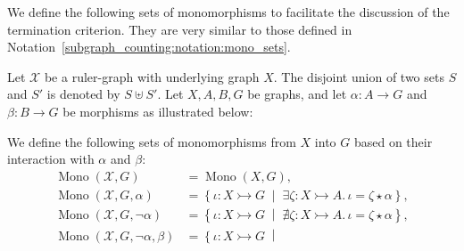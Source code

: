 
We define the following sets of monomorphisms to facilitate the discussion of the termination criterion. They are very similar to those defined in Notation~\ref{subgraph_counting:notation:mono_sets}. 
\begin{notation}
    \label{antipattern:notation:mono_sets}
  Let \( \mathcal{X}\) be a ruler-graph with underlying graph $X$. The disjoint union of two sets \( S \) and \( S' \) is denoted by \( S \uplus S' \). Let \( X, A, B, G \) be graphs, and let \( \alpha \mathop{\colon} A \mathop{\to} G \) and \( \beta \mathop{\colon} B \mathop{\to} G \) be morphisms as illustrated below:
  \begin{center}
    \end{center}
     We define the following sets of monomorphisms from $X$ into $G$ based on their interaction with $\alpha$ and $\beta$:    
    \begin{align*}
        \operatorname{Mono}(\mathcal{X},G) &= \operatorname{Mono}(X,G), 
        \\
        \operatorname{Mono}(\mathcal{X},G,\alpha) &= \left\{ \iota \mathop{\colon} X \rightarrowtail G 
        \;\middle|\; 
        \exists \zeta \mathop{\colon} X \rightarrowtail A.\, \iota \mathop{=} \zeta \mathop{\star} \alpha \right\}, 
        \\
        \operatorname{Mono}(\mathcal{X},G,\mathop{\lnot} \alpha) &= \left\{ \iota \mathop{\colon} X \rightarrowtail G 
        \;\middle|\; 
        \nexists \zeta \mathop{\colon} X \rightarrowtail A.\, \iota \mathop{=} \zeta \mathop{\star} \alpha \right\}, 
        \\
        \operatorname{Mono}(\mathcal{X},G,\mathop{\lnot} \alpha, \beta) &= \left\{ 
            \iota \mathop{\colon} X \rightarrowtail G \;\middle|\; 
                \begin{aligned}  

\end{aligned}
\end{align*}
\end{notation}
